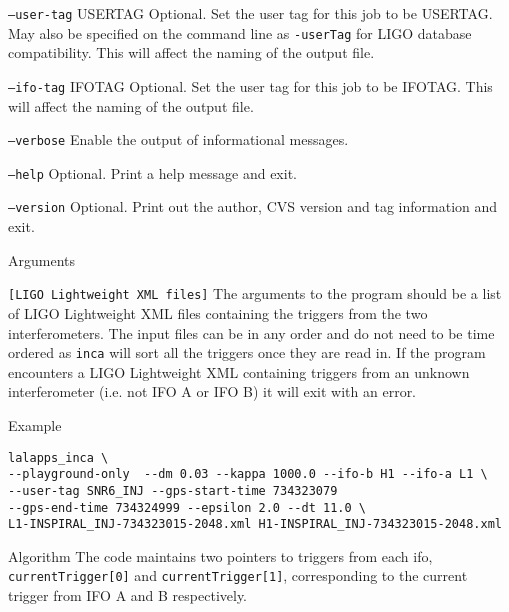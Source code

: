 \begin{entry}
\begin{entry}
\item[\texttt{--user-tag} \textsc{USERTAG}] Optional. Set the user tag
for this job to be \textsc{USERTAG}. May also be specified on the command
line as \texttt{-userTag} for LIGO database compatibility.  This will
affect the naming of the output file.

\item[\texttt{--ifo-tag} \textsc{IFOTAG}] Optional. Set the user tag for
this job to be \textsc{IFOTAG}.  This will affect the naming of the
output file.

\item[\texttt{--verbose}] Enable the output of informational messages.


\item[\texttt{--help}] Optional.  Print a help message and exit.

\item[\texttt{--version}] Optional.  Print out the author, CVS version and
tag information and exit.

\end{entry}

\item[Arguments]\leavevmode
\begin{entry}
\item[\texttt{[LIGO Lightweight XML files]}] The arguments to the program
should be a list of LIGO Lightweight XML files containing the triggers from
the two interferometers. The input files can be in any order and do not need
to be time ordered as \texttt{inca} will sort all the triggers once they are
read in. If the program encounters a LIGO Lightweight XML containing triggers
from an unknown interferometer (i.e. not IFO A or IFO B) it will exit with an
error.
\end{entry}

\item[Example]
\begin{verbatim}
lalapps_inca \
--playground-only  --dm 0.03 --kappa 1000.0 --ifo-b H1 --ifo-a L1 \
--user-tag SNR6_INJ --gps-start-time 734323079
--gps-end-time 734324999 --epsilon 2.0 --dt 11.0 \
L1-INSPIRAL_INJ-734323015-2048.xml H1-INSPIRAL_INJ-734323015-2048.xml
\end{verbatim}

\item[Algorithm]
The code maintains two pointers to triggers from each ifo,
\texttt{currentTrigger[0]} and \texttt{currentTrigger[1]}, corresponding to
the current trigger from IFO A and B respectively.


\end{entry}
